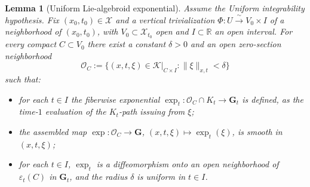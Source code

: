 \documentclass[reqno]{amsart}
\theoremstyle{plain}
\newtheorem{Lem}[Thm]{Lemma}
\theoremstyle{definition}
\renewcommand{\O}{\mathcal{O}}
\newcommand{\X}{\mathcal{X}}
\newcommand{\Kt}{K_t}
\newcommand{\expt}{\exp_t}
\newcommand{\K}{\mathcal{K}}
\begin{document}
\begin{Lem}[Uniform Lie-algebroid exponential]\label{lem:uniform-exp}
Assume the Uniform integrability hypothesis. Fix $(x_0,t_0)\in \X$ and a vertical trivialization $\Phi\colon U\xrightarrow{\ \sim\ }V_0\times I$ of a
neighborhood of $(x_0,t_0)$, with $V_0\subset \X_{t_0}$ open and
$I\subset\mathbb{R}$ an open interval. For every compact $C\subset V_0$ there exist a constant $\delta > 0$ and an open zero-section neighborhood
\[
  \mathcal{O}_C:=\bigl\{(x,t,\xi)\in \K|_{C\times I}:\|\xi\|_{x,t}<\delta\bigr\}
\]
such that:
\begin{itemize}
\item[(i)] for each $t\in I$ the fiberwise exponential
  $\expt\colon \O_C\cap\Kt\to \mathbf{G}_t$ is defined, as the time-$1$ evaluation of the $\Kt$-path issuing from $\xi$;
\item[(ii)] the assembled map $\exp\colon \O_C \to \mathbf{G}$,
  $(x,t,\xi)\mapsto\expt(\xi)$, is smooth in $(x,t,\xi)$;
\item[(iii)] for each $t\in I$, $\expt$ is a diffeomorphism onto an open neighborhood of $\varepsilon_t(C)$ in $\mathbf{G}_t$, and the radius $\delta$ is uniform in $t\in I$.
\end{itemize}
\end{Lem}
\end{document}
